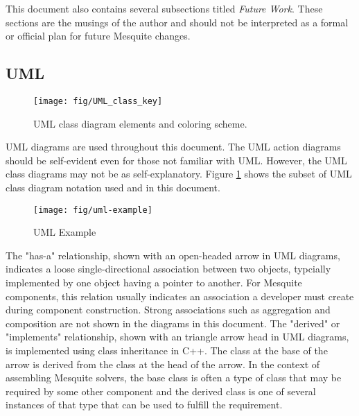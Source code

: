 \documentclass{article}
\begin{document}
This document also contains several subsections titled \emph{Future Work}.  These sections are the musings of the author and should not be interpreted as a formal or official plan for future Mesquite changes.   


\subsection{UML}

\begin{figure}[htb]
\begin{center}
\texttt{[image: fig/UML\_class\_key]}
\caption{UML class diagram elements and coloring scheme.\label{fig:UML}}
\end{center}
\end{figure}

UML diagrams are used throughout this document.  The UML action diagrams should be self-evident even for those not familiar with UML.  However, the UML class diagrams may not be as self-explanatory.  Figure \ref{fig:UML} shows the subset of UML class diagram notation used and in this document.

\begin{figure}[htb]
\begin{center}
\texttt{[image: fig/uml-example]}
\caption{UML Example\label{fig:UML-Example}}
\end{center}
\end{figure}

The "has-a" relationship, shown with an open-headed arrow in UML diagrams, indicates a loose single-directional association between two objects, typcially implemented by one object having a pointer to another.  For Mesquite components, this relation usually indicates an association a developer must create during component construction.  Strong associations such as aggregation and composition are not shown in the diagrams in this document.  The "derived" or "implements" relationship, shown with an triangle arrow head in UML diagrams, is implemented using class inheritance in C++.  The class at the base of the arrow is derived from the class at the head of the arrow.  In the context of assembling Mesquite solvers, the base class is often a type of class that may be required by some other component and the derived class is one of several instances of that type that can be used to fulfill the requirement.  
\end{document}
